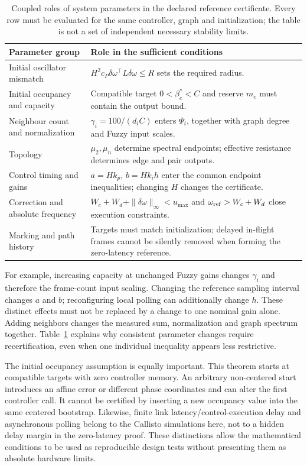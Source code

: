 \begin{table}[t]
\caption{Coupled roles of system parameters in the declared reference certificate.
Every row must be evaluated for the same controller, graph and initialization;
the table is not a set of independent necessary stability limits.}
\label{tab:parameter_roles}
\centering
\begin{tabular}{@{}lp{}@{}}\toprule
Parameter group & Role in the sufficient conditions\\\midrule
Initial oscillator mismatch & $H^2c_P\delta\omega^\top L\delta\omega\le R$ sets the required radius.\\
Initial occupancy and capacity & Compatible target $0<\beta_e^*<C$ and reserve $m_e$ must contain the output bound.\\
Neighbour count and normalization & $\gamma_i=100/(d_iC)$ enters $\Psi_i$, together with graph degree and Fuzzy input scales.\\
Topology & $\mu_2,\mu_n$ determine spectral endpoints; effective resistance determines edge and pair outputs.\\
Control timing and gains & $a=Hk_p$, $b=Hk_ih$ enter the common endpoint inequalities; changing $H$ changes the certificate.\\
Correction and absolute frequency & $W_c+W_d+\|\delta\omega\|_\infty<u_{\max}$ and $\omega_{\rm ref}>W_c+W_d$ close execution constraints.\\
Marking and path history & Targets must match initialization; delayed in-flight frames cannot be silently removed when forming the zero-latency reference.\\\bottomrule
\end{tabular}
\end{table}

For example, increasing capacity at unchanged Fuzzy gains changes
$\gamma_i$ and therefore the frame-count input scaling. Changing
the reference sampling interval changes $a$ and $b$; reconfiguring
local polling can additionally change $h$. These distinct effects
must not be replaced by a change to one nominal gain alone. Adding neighbors
changes the measured sum, normalization and graph spectrum together.
Table~\ref{tab:parameter_roles} explains why consistent parameter
changes require recertification, even when one individual inequality
appears less restrictive.

The initial occupancy assumption is equally important. This theorem
starts at compatible targets with zero controller memory. An arbitrary
non-centered start introduces an affine error or different phase
coordinates and can alter the first controller call. It cannot be
certified by inserting a new occupancy value into the same centered
bootstrap. Likewise, finite link latency/control-execution delay and asynchronous
polling belong to the Callisto simulations here, not to a hidden
delay margin in the zero-latency proof. These distinctions allow the
mathematical conditions to be used as reproducible design tests
without presenting them as absolute hardware limits.

